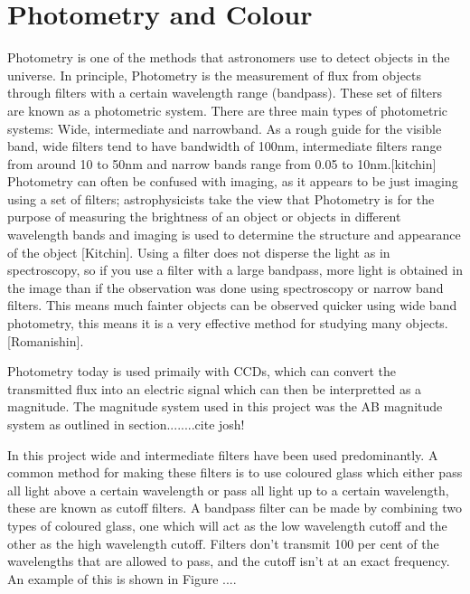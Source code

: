 

\section{Photometry and Colour} %
\label{section:Photometry_Colour}

Photometry is one of the methods that astronomers use to detect objects in the universe. In principle, Photometry is the measurement of flux from objects through filters with a certain wavelength range (bandpass). These set of filters are known as a photometric system. There are three main types of photometric systems: Wide, intermediate and narrowband. As a rough guide for the visible band, wide filters tend to have bandwidth of 100nm, intermediate filters range from around 10 to 50nm and narrow bands range from 0.05 to 10nm.[kitchin] Photometry can often be confused with imaging, as it appears to be just imaging using a set of filters; astrophysicists take the view that Photometry is for the purpose of measuring the brightness of an object or objects in different wavelength bands and imaging is used to determine the structure and appearance of the object [Kitchin]. Using a filter does not disperse the light as in spectroscopy, so if you use a filter with a large bandpass, more light is obtained in the image than if the observation was done using spectroscopy or narrow band filters. This means much fainter objects can be observed quicker using wide band photometry, this means it is a very effective method for studying many objects. [Romanishin].

Photometry today is used primaily with CCDs, which can convert the transmitted flux into an electric signal which can then be interpretted as a magnitude. The magnitude system used in this project was the AB magnitude system as outlined in section........cite josh! 

In this project wide and intermediate filters have been used predominantly.  A common method for making these filters is to use coloured glass which either pass all light above a certain wavelength or pass all light up to a certain wavelength, these are known as cutoff filters. A bandpass filter can be made by combining two types of coloured glass, one which will act as the low wavelength cutoff and the other as the high wavelength cutoff. Filters don't transmit 100 per cent of the wavelengths that are allowed to pass, and the cutoff isn't at an exact frequency. An example of this is shown in Figure ....  





